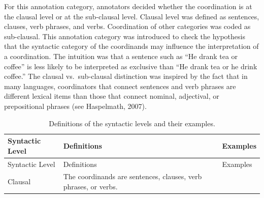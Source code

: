 \documentclass[oneside]{report}
\theoremstyle{definition}
\theoremstyle{definition}
\theoremstyle{definition}
\theoremstyle{remark}
\begin{document}
For this annotation category, annotators decided whether the
coordination is at the clausal level or at the sub-clausal level.
Clausal level was defined as sentences, clauses, verb phrases, and
verbs. Coordination of other categories was coded as sub-clausal. This
annotation category was introduced to check the hypothesis that the
syntactic category of the coordinands may influence the interpretation
of a coordination. The intuition was that a sentence such as ``He drank
tea or coffee'' is less likely to be interpreted as exclusive than ``He
drank tea or he drink coffee.'' The clausal vs.~sub-clausal distinction
was inspired by the fact that in many languages, coordinators that
connect sentences and verb phrases are different lexical items than
those that connect nominal, adjectival, or prepositional phrases (see
Haspelmath, 2007).
\begin{longtable}[]{@{}lll@{}}
\caption{\label{tab:syntacticLevel} Definitions of the syntactic levels and
their examples.}\tabularnewline
\toprule
\begin{minipage}[b]{0.17\columnwidth}\raggedright\strut
Syntactic Level\strut
\end{minipage} & \begin{minipage}[b]{0.37\columnwidth}\raggedright\strut
Definitions\strut
\end{minipage} & \begin{minipage}[b]{0.37\columnwidth}\raggedright\strut
Examples\strut
\end{minipage}\tabularnewline
\midrule
\endfirsthead
\toprule
\begin{minipage}[b]{0.17\columnwidth}\raggedright\strut
Syntactic Level\strut
\end{minipage} & \begin{minipage}[b]{0.37\columnwidth}\raggedright\strut
Definitions\strut
\end{minipage} & \begin{minipage}[b]{0.37\columnwidth}\raggedright\strut
Examples\strut
\end{minipage}\tabularnewline
\midrule
\endhead
\begin{minipage}[t]{0.17\columnwidth}\raggedright\strut
Clausal\strut
\end{minipage} & \begin{minipage}[t]{0.37\columnwidth}\raggedright\strut
The coordinands are sentences, clauses, verb phrases, or verbs.\strut
\end{minipage} & \begin{minipage}[t]{0.37\columnwidth}\raggedright\strut

\end{minipage}
\end{longtable}
\end{document}
